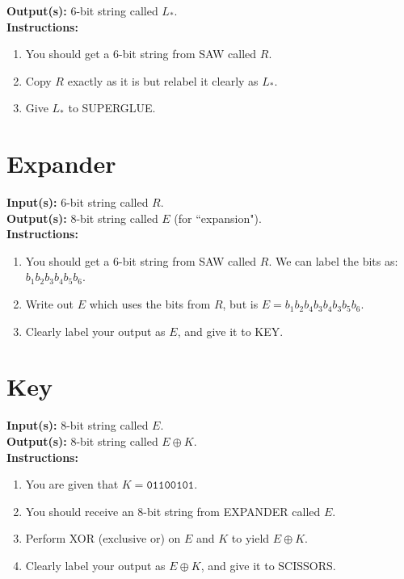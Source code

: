 \documentclass[12pt]{amsart}
\theoremstyle{plain}
\theoremstyle{definition}
\theoremstyle{remark}
\begin{document}
\textbf{Output(s):} 6-bit string called $L_*$.\\

\textbf{Instructions:}
\begin{enumerate}[1.]
	\item You should get a 6-bit string from SAW called $R$.	
	\item Copy $R$ exactly as it is but relabel it clearly as $L_*$.
	\item Give $L_*$ to SUPERGLUE.
\end{enumerate}

\newpage
\section*{Expander}
\textbf{Input(s):}  6-bit string called $R$.\\

\textbf{Output(s):} 8-bit string called $E$ (for ``expansion").\\

\textbf{Instructions:}
\begin{enumerate}[1.]
	\item You should get a 6-bit string from SAW called $R$.  We can label the bits as: $b_1b_2b_3b_4b_5b_6$.
	\item Write out $E$ which uses the bits from $R$, but is $E = b_1b_2b_4b_3b_4b_3b_5b_6$.
	\item Clearly label your output as $E$, and give it to KEY.
\end{enumerate}

\newpage
\section*{Key}
\textbf{Input(s):}  8-bit string called $E$.\\

\textbf{Output(s):} 8-bit string called $E\oplus K$.\\

\textbf{Instructions:}
\begin{enumerate}[1.]
	\item You are given that $K = \texttt{01100101}$.
	\item You should receive an 8-bit string from EXPANDER called $E$.
	\item Perform XOR (exclusive or) on $E$ and $K$ to yield $E\oplus K$.
	\item Clearly label your output as $E\oplus K$, and give it to SCISSORS.
\end{enumerate}
\end{document}
